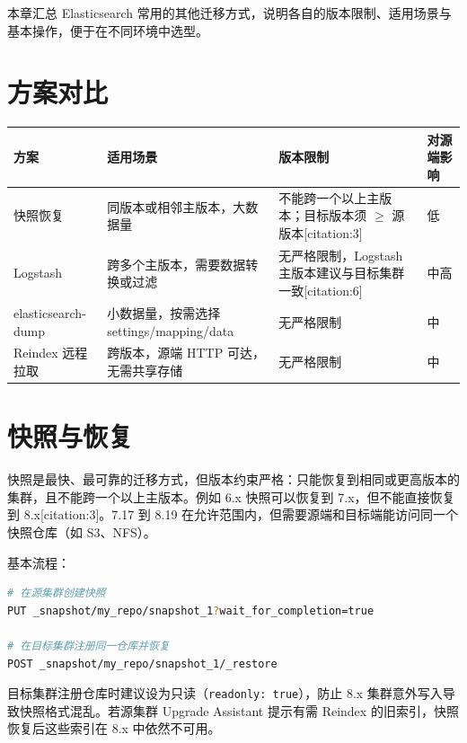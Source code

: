 \documentclass[11pt,a4paper,openany]{ctexbook}
\begin{document}
本章汇总 Elasticsearch 常用的其他迁移方式，说明各自的版本限制、适用场景与基本操作，便于在不同环境中选型。

\section{方案对比}

\begin{center}
\begin{tabular}{@{}p{}p{}p{}p{}@{}}
\toprule
方案 & 适用场景 & 版本限制 & 对源端影响 \\
\midrule
快照恢复 & 同版本或相邻主版本，大数据量 & 不能跨一个以上主版本；目标版本须 $\ge$ 源版本[citation:3] & 低 \\
Logstash & 跨多个主版本，需要数据转换或过滤 & 无严格限制，Logstash 主版本建议与目标集群一致[citation:6] & 中高 \\
elasticsearch-dump & 小数据量，按需选择 settings/mapping/data & 无严格限制 & 中 \\
Reindex 远程拉取 & 跨版本，源端 HTTP 可达，无需共享存储 & 无严格限制 & 中 \\
\bottomrule
\end{tabular}
\end{center}

\section{快照与恢复}

快照是最快、最可靠的迁移方式，但版本约束严格：只能恢复到相同或更高版本的集群，且不能跨一个以上主版本。例如 6.x 快照可以恢复到 7.x，但不能直接恢复到 8.x[citation:3]。7.17 到 8.19 在允许范围内，但需要源端和目标端能访问同一个快照仓库（如 S3、NFS）。

基本流程：

\begin{lstlisting}[language=bash]
# 在源集群创建快照
PUT _snapshot/my_repo/snapshot_1?wait_for_completion=true

# 在目标集群注册同一仓库并恢复
POST _snapshot/my_repo/snapshot_1/_restore
\end{lstlisting}

\begin{warn}
目标集群注册仓库时建议设为只读（\texttt{readonly: true}），防止 8.x 集群意外写入导致快照格式混乱。若源集群 Upgrade Assistant 提示有需 Reindex 的旧索引，快照恢复后这些索引在 8.x 中依然不可用。
\end{warn}
\end{document}
